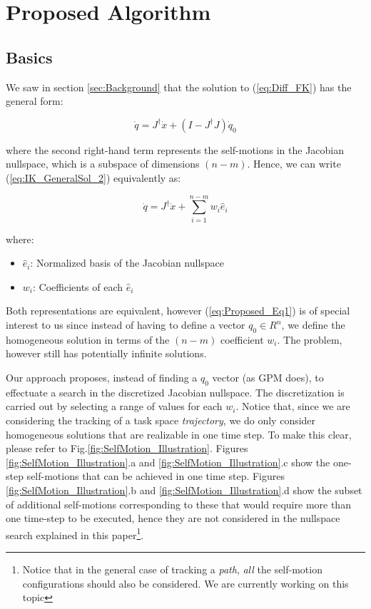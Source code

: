 \documentclass[conference]{IEEEtran}
\newcommand{\J}{\ensuremath{J}}
\newcommand{\Jps}{\ensuremath{J^{\dagger}}}
\newcommand{\dx}{\ensuremath{\dot{x}}}
\newcommand{\dq}{\ensuremath{\dot{q}}}
\newcommand{\q}{\ensuremath{q}}
\newcommand{\nsb}{\ensuremath{\hat{e}}} %
\newcommand{\nsc}{\ensuremath{w}}  %
\begin{document}
\section{Proposed Algorithm}
\label{sec:ProposedAlgorithm}

\subsection{Basics}
We saw in section \ref{sec:Background} that the solution to (\ref{eq:Diff_FK}) has the general form:

\begin{equation}
\dq = \Jps \dx + (I - \Jps \J)\dq_{0}
\label{eq:IK_GeneralSol_2}
\end{equation}

where the second right-hand term represents the self-motions in the Jacobian nullspace, which is a
subspace of dimensions $(n-m)$. Hence, we can write (\ref{eq:IK_GeneralSol_2}) equivalently as:

\begin{equation}
\dq = \Jps \dx + \displaystyle \sum_{i=1}^{n-m} \nsc_{i}\nsb_{i}
\label{eq:Proposed_Eq1}
\end{equation}

where:
\begin{itemize}
\item{ $\nsb_{i}$: Normalized basis of the Jacobian nullspace}
\item{$\nsc_{i}$: Coefficients of each $\nsb_{i}$}
\end{itemize}

Both representations are equivalent, however (\ref{eq:Proposed_Eq1}) is of special interest to us since
instead of having to define a vector $\q_{0} \in R^{n}$, we define the homogeneous solution in terms of 
the $(n-m)$ coefficient $\nsc_{i}$. The problem, however still has potentially infinite solutions.

Our approach proposes, instead of finding a $\q_{0}$ vector (as GPM does), to effectuate a 
search in the discretized Jacobian nullspace. The discretization is carried out by selecting a range of
values for each $\nsc_{i}$. Notice that, since we are considering the tracking of a task space \textit{trajectory}, 
we do only consider homogeneous solutions that are realizable in one time step. To make this clear, please refer 
to Fig.\ref{fig:SelfMotion_Illustration}. Figures \ref{fig:SelfMotion_Illustration}.a and 
\ref{fig:SelfMotion_Illustration}.c show the one-step self-motions that can be achieved in one time step. Figures \ref{fig:SelfMotion_Illustration}.b 
and \ref{fig:SelfMotion_Illustration}.d show the subset of additional self-motions corresponding to these 
that would require more than one time-step to be executed, hence they are not considered in 
the nullspace search explained in this paper\footnote{Notice that in the
general case of tracking a \textit{path}, \textit{all} the self-motion configurations should also be considered. We
are currently working on this topic}.     
\end{document}
